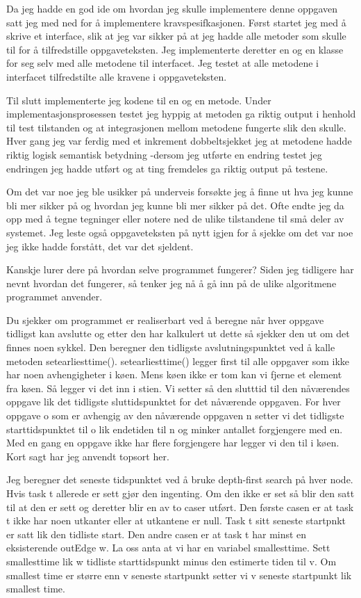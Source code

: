 \documentclass[]{article}
\begin{document}
Da jeg hadde en god ide om hvordan jeg skulle implementere denne oppgaven satt jeg med ned for å implementere kravspesifkasjonen. Først startet jeg med å skrive et interface, slik at jeg var sikker på at jeg hadde alle metoder som skulle til for å tilfredstille oppgaveteksten. Jeg implementerte deretter en og en klasse for seg selv med alle metodene til interfacet. Jeg testet at alle metodene i interfacet tilfredstilte alle kravene i oppgaveteksten.

Til slutt implementerte jeg kodene til en og en metode. Under implementasjonsprosessen testet jeg hyppig at metoden ga riktig output i henhold til test tilstanden og at integrasjonen mellom metodene fungerte slik den skulle. 
Hver gang jeg var ferdig med et inkrement dobbeltsjekket jeg at metodene hadde riktig logisk semantisk betydning  -dersom jeg utførte en endring testet jeg endringen jeg hadde utført og at ting fremdeles ga riktig output på testene.

Om det var noe jeg ble usikker på underveis forsøkte jeg å finne ut hva jeg kunne bli mer sikker på og hvordan jeg kunne bli mer sikker på det. Ofte endte jeg da opp med å tegne tegninger eller notere ned de ulike tilstandene til små deler av systemet. Jeg leste også oppgaveteksten på nytt igjen for å sjekke om det var noe jeg ikke hadde forstått, det var det sjeldent.

Kanskje lurer dere på hvordan selve programmet fungerer? Siden jeg tidligere har nevnt hvordan det fungerer, så tenker jeg nå å gå inn på de ulike algoritmene programmet anvender.

Du sjekker om programmet er realiserbart ved å beregne når hver oppgave tidligst kan avslutte og etter den har kalkulert ut dette så sjekker den ut om det finnes noen sykkel. Den beregner den tidligste avslutningspunktet ved å kalle metoden setearliesttime(). setearliesttime() legger first til alle oppgaver som ikke har noen avhengigheter i køen. Mens køen ikke er tom kan vi fjerne et element fra køen. Så legger vi det inn i stien. Vi setter så den slutttid til den nåværendes oppgave lik det tidligste sluttidspunktet for det nåværende oppgaven. For hver oppgave o som er avhengig av den nåværende oppgaven n setter vi det tidligste starttidspunktet til o lik endetiden til n og minker antallet forgjengere med en. Med en gang en oppgave ikke har flere forgjengere har legger vi den til i køen. Kort sagt har jeg anvendt topsort her.

Jeg beregner det seneste tidspunktet ved å bruke depth-first search på hver node. Hvis task t allerede er sett gjør den ingenting. Om den ikke er set så blir den satt til at den er sett og deretter blir en av to caser utført. Den første casen er at task t ikke har noen utkanter eller at utkantene er null. Task t sitt seneste startpnkt er satt lik den tidliste start. Den andre casen er at task t har minst en eksisterende outEdge w. La oss anta at vi har en variabel smallesttime. Sett smallesttime lik w tidliste starttidspunkt minus den estimerte tiden til v. Om smallest time er større enn v seneste startpunkt setter vi v seneste startpunkt lik 
smallest time.
\end{document}

